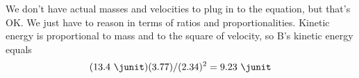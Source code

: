 We don't have actual masses and velocities to plug in to
the equation, but that's OK. We just have to reason in terms
of ratios and proportionalities. Kinetic energy is
proportional to mass and to the square of velocity, so B's
kinetic energy equals
\begin{equation*}
		(13.4\ \junit)(3.77)/(2.34)^2  =  9.23\ \junit 
\end{equation*}



